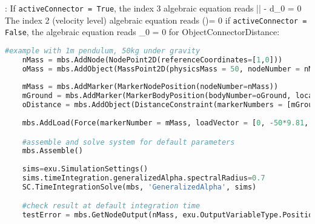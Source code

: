     :
    If \texttt{activeConnector = True}, the index 3 algebraic equation reads
    \be
      \left|\right| - d_0 = 0
    \ee
    The index 2 (velocity level) algebraic equation reads
    \be
      \left(\right)\tp \Delta\vv = 0
    \ee
    if \texttt{activeConnector = False}, the algebraic equation reads
    \be
      \lambda_0 = 0
    \ee
{} for ObjectConnectorDistance:
\pythonstyle
\begin{lstlisting}[language=Python, firstnumber=1]
    #example with 1m pendulum, 50kg under gravity
    nMass = mbs.AddNode(NodePoint2D(referenceCoordinates=[1,0]))
    oMass = mbs.AddObject(MassPoint2D(physicsMass = 50, nodeNumber = nMass))
    
    mMass = mbs.AddMarker(MarkerNodePosition(nodeNumber=nMass))
    mGround = mbs.AddMarker(MarkerBodyPosition(bodyNumber=oGround, localPosition = [0,0,0]))
    oDistance = mbs.AddObject(DistanceConstraint(markerNumbers = [mGround, mMass], distance = 1))
    
    mbs.AddLoad(Force(markerNumber = mMass, loadVector = [0, -50*9.81, 0])) 

    #assemble and solve system for default parameters
    mbs.Assemble()
    
    sims=exu.SimulationSettings()
    sims.timeIntegration.generalizedAlpha.spectralRadius=0.7
    SC.TimeIntegrationSolve(mbs, 'GeneralizedAlpha', sims)

    #check result at default integration time
    testError = mbs.GetNodeOutput(nMass, exu.OutputVariableType.Position)[0] - (-0.9845225086606828)

\end{lstlisting}

\newpage

